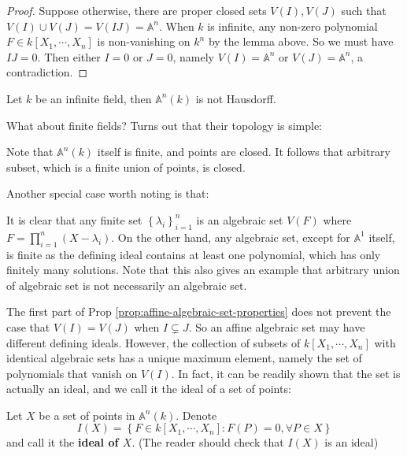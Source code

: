 \documentclass{note-eng}
\begin{document}
\begin{proof}
    Suppose otherwise, there are proper closed sets $V(I), V(J)$ such that $V(I) \cup V(J) = V(IJ) = \mathbb{A}^n$. When $k$ is infinite, any non-zero polynomial $F \in k[X_1, \cdots, X_n]$ is non-vanishing on $k^n$ by the lemma above. So we must have $IJ = 0$. Then either $I = 0$ or $J = 0$, namely $V(I) = \mathbb{A}^n$ or $V(J) = \mathbb{A}^n$, a contradiction.
\end{proof}

\begin{corollary}
    Let $k$ be an infinite field, then $\mathbb{A}^n(k)$ is not Hausdorff.
\end{corollary}

What about finite fields? Turns out that their topology is simple:

\begin{example}
    Note that $\mathbb{A}^n(k)$ itself is finite, and points are closed. It follows that arbitrary subset, which is a finite union of points, is closed.
\end{example}

Another special case worth noting is that:

\begin{example}
    It is clear that any finite set $\left\lbrace \lambda_i \right\rbrace_{i = 1}^n$ is an algebraic set $V(F)$ where $F = \prod\limits_{i = 1}^{n} (X - \lambda_i)$. On the other hand, any algebraic set, except for $\mathbb{A}^1$ itself, is finite as the defining ideal contains at least one polynomial, which has only finitely many solutions. Note that this also gives an example that arbitrary union of algebraic set is not necessarily an algebraic set.
\end{example}

The first part of Prop \ref{prop:affine-algebraic-set-properties} does not prevent the case that $V(I) = V(J)$ when $I \subsetneq J$. So an affine algebraic set may have different defining ideals. However, the collection of subsets of $k[X_1, \cdots, X_n]$ with identical algebraic sets has a unique maximum element, namely the set of polynomials that vanish on $V(I)$. In fact, it can be readily shown that the set is actually an ideal, and we call it the ideal of a set of points:

\begin{definition}
    Let $X$ be a set of points in $\mathbb{A}^n(k)$. Denote
    $$I(X) = \left\lbrace F \in k[X_1, \cdots, X_n]: F(P) = 0, \forall P \in X \right\rbrace$$
    and call it the \textbf{ideal of $X$}. (The reader should check that $I(X)$ is an ideal)
\end{definition}
\end{document}
